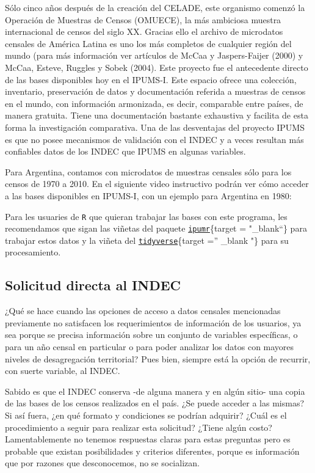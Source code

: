 \documentclass[
]{book}
\begin{document}
Sólo cinco años después de la creación del CELADE, este organismo comenzó la Operación de Muestras de Censos (OMUECE), la más ambiciosa muestra internacional de censos del siglo XX. Gracias ello el archivo de microdatos censales de América Latina es uno los más completos de cualquier región del mundo (para más información ver artículos de McCaa y Jaspers-Faijer (2000) y McCaa, Esteve, Ruggles y Sobek (2004). Este proyecto fue el antecedente directo de las bases disponibles hoy en el IPUMS-I. Este espacio ofrece una colección, inventario, preservación de datos y documentación referida a muestras de censos en el mundo, con información armonizada, es decir, comparable entre países, de manera gratuita. Tiene una documentación bastante exhaustiva y facilita de esta forma la investigación comparativa. Una de las desventajas del proyecto IPUMS es que no posee mecanismos de validación con el INDEC y a veces resultan más confiables datos de los INDEC que IPUMS en algunas variables.

Para Argentina, contamos con microdatos de muestras censales sólo para los censos de 1970 a 2010. En el siguiente video instructivo podrán ver cómo acceder a las bases disponibles en IPUMS-I, con un ejemplo para Argentina en 1980:

Para les usuaries de \texttt{R} que quieran trabajar las bases con este programa, les recomendamos que sigan las viñetas del paquete \href{https://cran.r-project.org/web/packages/ipumsr/vignettes/ipums.html}{\texttt{ipumr}}\{target = "\_blank``\} para trabajar estos datos y la viñeta del \href{https://www.tidyverse.org/}{\texttt{tidyverse}}\{target ='' \_blank "\} para su procesamiento.

\hypertarget{solicitud-directa-al-indec}{%
\subsection{Solicitud directa al INDEC}\label{solicitud-directa-al-indec}}

¿Qué se hace cuando las opciones de acceso a datos censales mencionadas previamente no satisfacen los requerimientos de información de los usuarios, ya sea porque se precisa información sobre un conjunto de variables específicas, o para un año censal en particular o para poder analizar los datos con mayores niveles de desagregación territorial? Pues bien, siempre está la opción de recurrir, con suerte variable, al INDEC.

Sabido es que el INDEC conserva -de alguna manera y en algún sitio- una copia de las bases de los censos realizados en el país. ¿Se puede acceder a las mismas? Si así fuera, ¿en qué formato y condiciones se podrían adquirir? ¿Cuál es el procedimiento a seguir para realizar esta solicitud? ¿Tiene algún costo? Lamentablemente no tenemos respuestas claras para estas preguntas pero es probable que existan posibilidades y criterios diferentes, porque es información que por razones que desconocemos, no se socializan.
\end{document}
